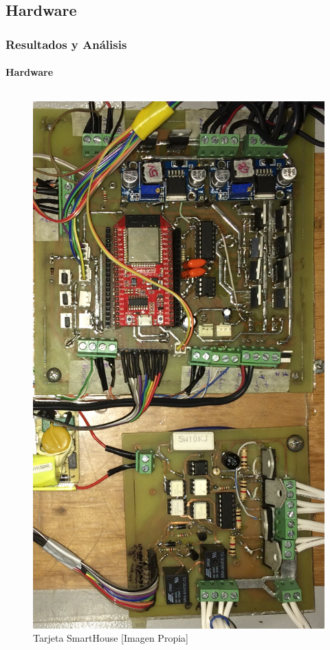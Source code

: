 \subsection{Hardware}
\begin{frame}[t]
\frametitle{Resultados y Análisis}
\framesubtitle{Hardware}
\begin{columns}
\begin{figure}
	\centering
	\caption{Tarjeta SmartHouse [Imagen Propia]}
	\label{fig:tarjeta}
	\includegraphics[width=\linewidth]{Imagenes/Tarjeta.jpg}

\end{figure}
\end{columns}
\end{frame}
